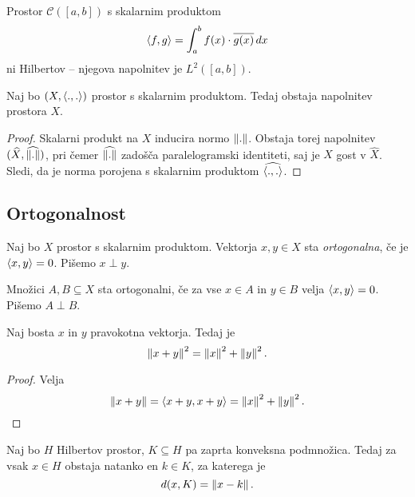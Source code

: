 \begin{zgled}
Prostor $\mathcal{C}([a,b])$ s skalarnim produktom
\[
\left\langle f,g\right\rangle = \int_a^b f(x) \cdot \overline{g(x)}\,dx
\]
ni Hilbertov -- njegova napolnitev je $L^2([a,b])$.
\end{zgled}

\begin{trditev}
Naj bo $(X, \left\langle .,.\right\rangle)$ prostor s skalarnim produktom. Tedaj
obstaja napolnitev prostora $X$.
\end{trditev}

\begin{proof}
Skalarni produkt na $X$ inducira normo $\left\lVert .\right\rVert$. Obstaja torej
napolnitev $(\widehat{X}, \widehat{\left\lVert .\right\rVert})$, pri čemer
$\widehat{\left\lVert .\right\rVert}$ zadošča paralelogramski identiteti, saj je $X$
gost v $\widehat{X}$. Sledi, da je norma porojena s skalarnim
produktom $\widehat{\left\langle .,.\right\rangle}$.
\end{proof}

\newpage

\subsection{Ortogonalnost}

\begin{definicija}
Naj bo $X$ prostor s skalarnim produktom. Vektorja $x,y \in X$ sta
\emph{ortogonalna}, če je
$\left\langle x,y\right\rangle = 0$. Pišemo $x \perp y$.
\end{definicija}

\begin{definicija}
Množici $A,B \subseteq X$ sta ortogonalni, če za vse $x \in A$ in
$y \in B$ velja $\left\langle x,y\right\rangle = 0$. Pišemo $A \perp B$.
\end{definicija}

\begin{izrek}[Pitagora]
Naj bosta $x$ in $y$ pravokotna vektorja. Tedaj je
\[
\left\lVert x+y\right\rVert^2 = \left\lVert x\right\rVert^2 + \left\lVert y\right\rVert^2.
\]
\end{izrek}

\begin{proof}
Velja
\[
\left\lVert x+y\right\rVert = \left\langle x+y,x+y\right\rangle = \left\lVert x\right\rVert^2 + \left\lVert y\right\rVert^2. \qedhere
\]
\end{proof}

\begin{izrek}
Naj bo $H$ Hilbertov prostor, $K \subseteq H$ pa zaprta konveksna
podmnožica. Tedaj za vsak $x \in H$ obstaja natanko en $k \in K$,
za katerega je
\[
d(x,K) = \left\lVert x-k\right\rVert.
\]
\end{izrek}

